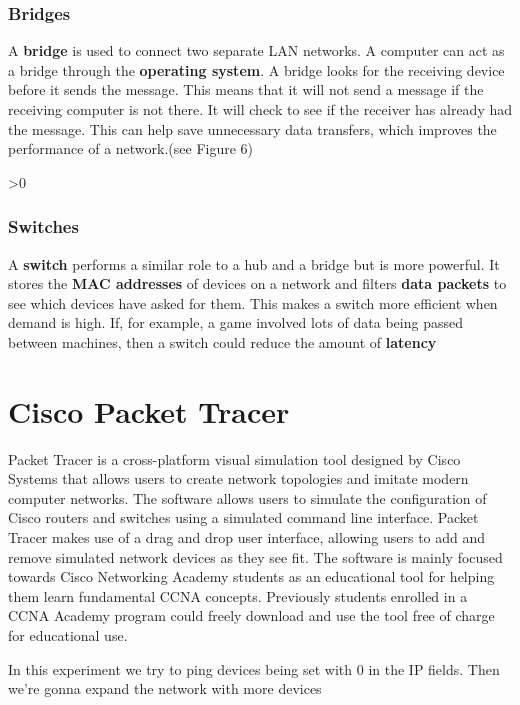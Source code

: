 \documentclass[a4paper,12pt]{article}
\makeatletter
\newcommand{\wrapfill}{\par\ifnum\value{WF@wrappedlines}>0
  \addtocounter{WF@wrappedlines}{-1}%
  \null\vspace{\arabic{WF@wrappedlines}\baselineskip}%
  \WFclear
\fi}
\makeatother
\begin{document}
\subsubsection{Bridges}
A \textbf{bridge} is used to connect two separate LAN networks. A computer can act as a bridge through the \textbf{operating system}. A bridge looks for the receiving device before it sends the message. This means that it will not send a message if the receiving computer is not there. It will check to see if the receiver has already had the message. This can help save unnecessary data transfers, which improves the performance of a network.(see Figure 6)

\wrapfill
\clearpage

\subsubsection{Switches}
A \textbf{switch} performs a similar role to a hub and a bridge but is more powerful. It stores the \textbf{MAC addresses} of devices on a network and filters \textbf{data packets} to see which devices have asked for them. This makes a switch more efficient when demand is high. If, for example, a game involved lots of data being passed between machines, then a switch could reduce the amount of \textbf{latency}

\section{Cisco Packet Tracer}

Packet Tracer is a cross-platform visual simulation tool designed by Cisco Systems that allows users to create network topologies and imitate modern computer networks. The software allows users to simulate the configuration of Cisco routers and switches using a simulated command line interface. Packet Tracer makes use of a drag and drop user interface, allowing users to add and remove simulated network devices as they see fit. The software is mainly focused towards Cisco Networking Academy students as an educational tool for helping them learn fundamental CCNA concepts. Previously students enrolled in a CCNA Academy program could freely download and use the tool free of charge for educational use.\footnotemark{} \newline

In this experiment we try to ping devices being set with 0 in the IP fields. Then we're gonna expand the network with more devices
\end{document}
